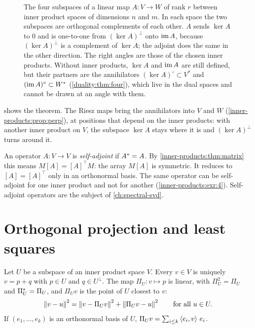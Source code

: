\begin{notechapter}
\begin{figure}[ht]
\caption{The four subspaces of a linear map $A:V\to W$ of rank $r$
between inner product spaces of dimensions $n$ and $m$. In each space
the two subspaces are orthogonal complements of each other. $A$ sends
$\ker A$ to $0$ and is one-to-one from $(\ker A)^\perp$ onto $\operatorname{im} A$,
because $(\ker A)^\perp$ is a complement of $\ker A$; the adjoint does
the same in the other direction. The right angles are those of the
chosen inner products. Without inner products, $\ker A$ and $\operatorname{im} A$
are still defined, but their partners are the annihilators
$(\ker A)^\circ\subset V^*$ and $(\operatorname{im} A)^\circ\subset W^*$
(\cref{duality:thm:four}), which live in the dual spaces and cannot be
drawn at an angle with them.}
\label{inner-products:fig:four}
\end{figure}

 shows the theorem. The Riesz maps bring
the annihilators into $V$ and $W$ (\cref{inner-products:prop:perp}), at
positions that depend on the inner products: with another inner product
on $V$, the subspace $\ker A$ stays where it is and $(\ker A)^\perp$
turns around it.

\begin{pitfall}
An operator $A:V\to V$ is \emph{self-adjoint} if $A^{*} = A$. By
\cref{inner-products:thm:matrix} this means $M[A] = [A]^\top M$: the array
$M[A]$ is symmetric. It reduces to $[A] = [A]^\top$ only in an orthonormal
basis. The same operator can be self-adjoint for one inner product and not
for another (\cref{inner-products:exr:4}). Self-adjoint operators are the
subject of \cref{ch:spectral-svd}.
\end{pitfall}

\section{Orthogonal projection and least squares}
\label{inner-products:sec:projection}

\begin{theorem}\label{inner-products:thm:projection}
Let $U$ be a subspace of an inner product space $V$. Every $v\in V$ is
uniquely $v = p + q$ with $p\in U$ and $q\in U^\perp$. The map
$\Pi_U:v\mapsto p$ is linear, with $\Pi_U^2 = \Pi_U$ and
$\Pi_U^{*} = \Pi_U$, and $\Pi_Uv$ is the point of $U$ closest to $v$:
\[
  \left\|v - u\right\|^2 = \left\|v - \Pi_Uv\right\|^2 + \left\|\Pi_Uv - u\right\|^2
  \qquad\text{for all }u\in U .
\]
If $(e_1,\dots,e_k)$ is an orthonormal basis of $U$,
$\Pi_Uv = \sum_{i\leq k}\left\langle e_i, v \right\rangle\,e_i$.
\end{theorem}


\end{notechapter}
